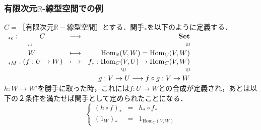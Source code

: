\documentclass[uplatex, 12pt, a4paper, dvipdfmx]{jsarticle}
\begin{document}
\subsubsection{有限次元$\mathbb{R}$-線型空間での例}
$C=［有限次元\mathbb{R}-線型空間］$とする．関手$_*$を以下のように定義する．\\$\begin{array}{lcr} {}_{*c} : \hspace{1cm} C&\longrightarrow & \mathbf{Set}\\ \hspace{1cm} \rotatebox{90}{$\in$} & & \rotatebox{90}{$\in$} \\ \hspace{1cm} W & \longmapsto & \mathrm{Hom}_{\mathbb{R}}(V,W)=\mathrm{Hom}_C(V,W) \\ {}_{*M}: (f:U\rightarrow W) & \longmapsto & f_*:\mathrm{Hom}_C(V,U)\rightarrow \mathrm{Hom}_C(V,W) \\ & & \rotatebox{90}{$\in$} \hspace{3cm} \rotatebox{90}{$\in$} \\ & & g:V\rightarrow U \longrightarrow f\circ g:V\rightarrow W \end{array}$\\
$h:W\longrightarrow W'$を勝手に取った時，これには$f:U\longrightarrow W$との合成が定義され，あとは以下の２条件を満たせば関手として定められたことになる．
$$\left\{ \begin{array}{lcr} (h\circ f)_* & = & h_*\circ f_* \\ (1_W)_* &=& 1_{\mathrm{Hom}_C(V,W)}  \end{array} \right.$$
\end{document}
